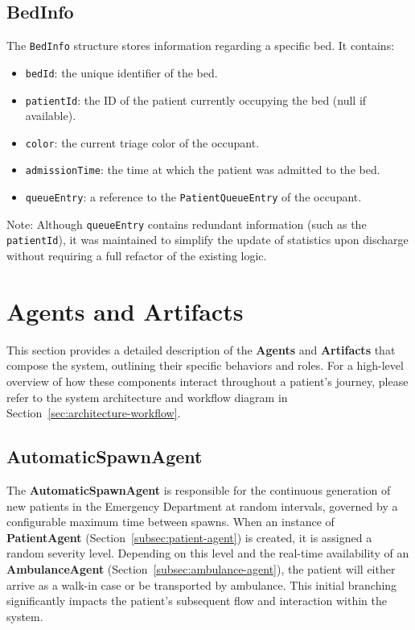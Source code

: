 \documentclass{article}[12pt]
\begin{document}
\subsection{BedInfo}
\label{subsec:bed-info}
The \texttt{BedInfo} structure stores information regarding a specific bed. It contains:
\begin{itemize}
    \item \texttt{bedId}: the unique identifier of the bed.
    \item \texttt{patientId}: the ID of the patient currently occupying the bed (null if available).
    \item \texttt{color}: the current triage color of the occupant.
    \item \texttt{admissionTime}: the time at which the patient was admitted to the bed.
    \item \texttt{queueEntry}: a reference to the \texttt{PatientQueueEntry} of the occupant. 
\end{itemize}
\noindent
Note: Although \texttt{queueEntry} contains redundant information (such as the \texttt{patientId}), it was maintained to simplify the update of statistics upon discharge without requiring a full refactor of the existing logic.

\section{Agents and Artifacts}
\label{sec:agents-artifacts}

This section provides a detailed description of the \textbf{Agents} and \textbf{Artifacts} that compose the system, outlining their specific behaviors and roles. 
For a high-level overview of how these components interact throughout a patient's journey, please refer to the system architecture and workflow diagram in Section~\ref{sec:architecture-workflow}.

\subsection{AutomaticSpawnAgent}
\label{subsec:automatic-spawn-agent}

The \textbf{AutomaticSpawnAgent} is responsible for the continuous generation of new patients in the Emergency Department at random intervals, governed by a configurable maximum time between spawns.
\noindent
When an instance of \textbf{PatientAgent} (Section~\ref{subsec:patient-agent}) is created, it is assigned a random severity level. Depending on this level and the real-time availability of an \textbf{AmbulanceAgent} (Section~\ref{subsec:ambulance-agent}), the patient will either arrive as a walk-in case or be transported by ambulance. This initial branching significantly impacts the patient's subsequent flow and interaction within the system.
\end{document}

